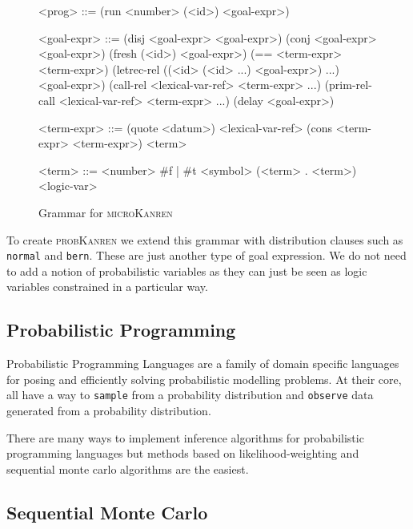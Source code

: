 \documentclass[
]{ceurart}
\begin{document}
\begin{figure}
  \centering
  \begin{grammar}
<prog> ::= (run <number> (<id>) <goal-expr>)

<goal-expr> ::= (disj <goal-expr> <goal-expr>) \alt
	        (conj <goal-expr> <goal-expr>) \alt
                (fresh (<id>) <goal-expr>) \alt
		(== <term-expr> <term-expr>) \alt
		(letrec-rel ((<id> (<id> ...) <goal-expr>) ...) \\
		\hspace{\grammarindent} <goal-expr>) \alt
		(call-rel <lexical-var-ref> <term-expr> ...) \alt
		(prim-rel-call <lexical-var-ref> <term-expr> ...) \alt
		(delay <goal-expr>)

<term-expr> ::= (quote <datum>) \alt
                <lexical-var-ref> \alt
                (cons <term-expr> <term-expr>) \alt
                <term>

<term> ::= <number> \alt
           \#f | \#t \alt
	   <symbol> \alt
	   (<term> . <term>) \alt
	   <logic-var>

  \end{grammar}
  \caption{Grammar for \textsc{microKanren}}
  \label{fig:grammar}
\end{figure}

To create \textsc{probKanren} we extend this grammar with distribution clauses
such as \texttt{normal} and \texttt{bern}. These are just another type
of goal expression. We do not need to add a notion of probabilistic
variables as they can just be seen as logic variables constrained in
a particular way.


\subsection{Probabilistic Programming}

Probabilistic Programming Languages\cite{wood2014new,
  van2018introduction} are a family of domain specific languages for
posing and efficiently solving probabilistic modelling problems. At
their core, all have a way to \texttt{sample} from a probability
distribution and \texttt{observe} data generated from a probability
distribution.

There are many ways to implement inference algorithms for probabilistic
programming languages but methods based on likelihood-weighting and
sequential monte carlo algorithms are the easiest.

\subsection{Sequential Monte Carlo}
\end{document}
